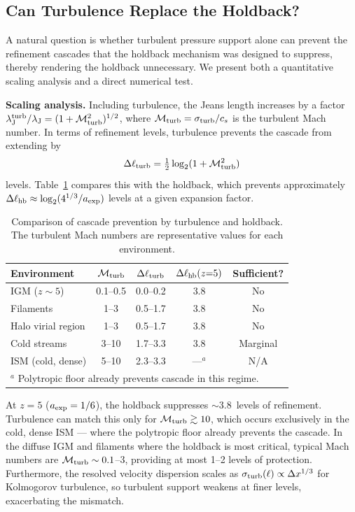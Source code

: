 \documentclass[fleqn,usenatbib]{mnras}
\newcommand{\lJ}{\lambda_{\rm J}}
\begin{document}
\subsection{Can Turbulence Replace the Holdback?}
\label{sec:turb_vs_holdback}

A natural question is whether turbulent pressure support alone can
prevent the refinement cascades that the holdback mechanism was
designed to suppress, thereby rendering the holdback unnecessary.
We present both a quantitative scaling analysis and a direct
numerical test.

\textbf{Scaling analysis.}
Including turbulence, the Jeans length increases by a factor
$\lJ^{\rm turb}/\lJ = (1 + \mathcal{M}_{\rm turb}^2)^{1/2}$,
where $\mathcal{M}_{\rm turb} = \sigma_{\rm turb}/c_s$ is the
turbulent Mach number.  In terms of refinement levels, turbulence
prevents the cascade from extending by
\begin{equation}
  \Delta\ell_{\rm turb} = \tfrac{1}{2}\log_2(1 + \mathcal{M}_{\rm turb}^2)
  \label{eq:turb_levels}
\end{equation}
levels.  Table~\ref{tab:turb_holdback} compares this with the
holdback, which prevents approximately
$\Delta\ell_{\rm hb} \approx \log_2(4^{1/3}/a_{\rm exp})$ levels at
a given expansion factor.

\begin{table}
\centering
\caption{Comparison of cascade prevention by turbulence and holdback.
The turbulent Mach numbers are representative values for each
environment.}
\label{tab:turb_holdback}
\begin{tabular}{lcccc}
\toprule
Environment & $\mathcal{M}_{\rm turb}$ & $\Delta\ell_{\rm turb}$ &
$\Delta\ell_{\rm hb}(z{=}5)$ & Sufficient? \\
\midrule
IGM ($z\sim5$)     & 0.1--0.5 & 0.0--0.2 & 3.8 & No \\
Filaments          & 1--3     & 0.5--1.7 & 3.8 & No \\
Halo virial region & 1--3     & 0.5--1.7 & 3.8 & No \\
Cold streams       & 3--10    & 1.7--3.3 & 3.8 & Marginal \\
ISM (cold, dense)  & 5--10    & 2.3--3.3 & ---$^a$ & N/A \\
\bottomrule
\multicolumn{5}{l}{\footnotesize $^a$ Polytropic floor already
prevents cascade in this regime.}
\end{tabular}
\end{table}

At $z = 5$ ($a_{\rm exp} = 1/6$), the holdback suppresses
$\sim$3.8~levels of refinement.  Turbulence can match this only
for $\mathcal{M}_{\rm turb} \gtrsim 10$, which occurs exclusively
in the cold, dense ISM --- where the polytropic floor already
prevents the cascade.  In the diffuse IGM and filaments where the
holdback is most critical, typical Mach numbers are
$\mathcal{M}_{\rm turb} \sim 0.1$--$3$, providing at most 1--2
levels of protection.  Furthermore, the resolved velocity
dispersion scales as $\sigma_{\rm turb}(\ell) \propto \Delta
x^{1/3}$ for Kolmogorov turbulence, so turbulent support weakens
at finer levels, exacerbating the mismatch.
\end{document}
